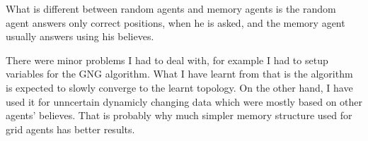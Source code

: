 What is different between random agents and memory agents is the random agent answers only correct positions, when he is asked, and the memory agent usually answers using his believes.


There were minor problems I had to deal with, for example I had to setup variables for the GNG algorithm. What I have learnt from that is the algorithm is expected to slowly converge to the learnt topology. On the other hand, I have used it for unncertain dynamicly changing data which were mostly based on other agents' believes. That is probably why much simpler memory structure used for grid agents has better results.




 


